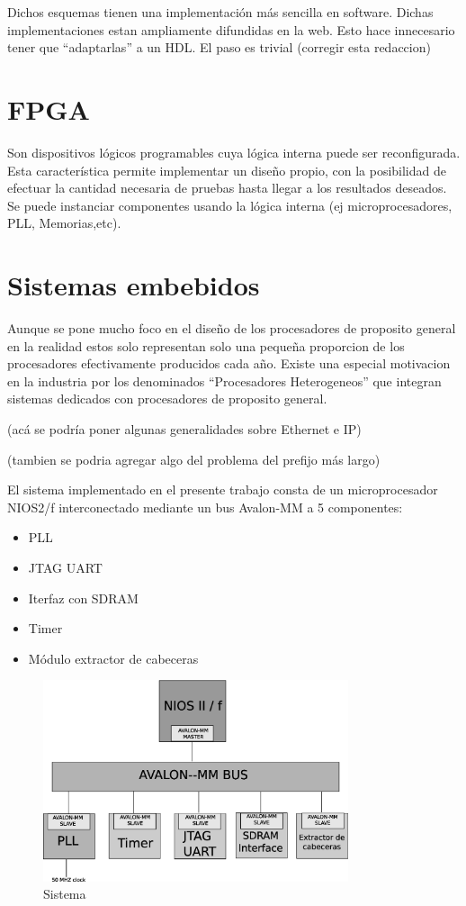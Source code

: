 Dichos esquemas tienen una implementación más sencilla en software. Dichas implementaciones estan ampliamente difundidas en la web.
Esto hace innecesario tener que “adaptarlas” a un HDL. El paso es trivial (corregir esta redaccion)

\section{FPGA}
Son dispositivos lógicos programables cuya lógica interna puede ser reconfigurada. Esta característica permite implementar un diseño propio, con la posibilidad de efectuar la cantidad necesaria de pruebas hasta llegar a los resultados deseados. Se puede instanciar componentes usando la lógica interna (ej microprocesadores, PLL, Memorias,etc).

\section{Sistemas embebidos}
Aunque se pone mucho foco en el  diseño de los procesadores de proposito general en la realidad estos solo representan solo una pequeña proporcion de los procesadores efectivamente producidos cada año.  Existe una especial motivacion en la industria por los denominados “Procesadores Heterogeneos” que integran sistemas dedicados con procesadores de proposito general.

(acá se podría poner algunas generalidades sobre Ethernet e IP)

(tambien se podria agregar algo del problema del prefijo más largo)


El sistema implementado en el presente trabajo consta de un microprocesador NIOS2/f interconectado mediante un bus Avalon-MM a 5 componentes: 
\begin{itemize}
\item PLL
\item JTAG UART
\item Iterfaz con SDRAM
\item Timer
\item Módulo extractor de cabeceras
\end{itemize}


\begin{figure}[h]
  \centering
	\includegraphics[width=0.80\textwidth]{2-sistema/graf/sistema.eps}
  \caption{Sistema}
  \label{fig}
\end{figure}

